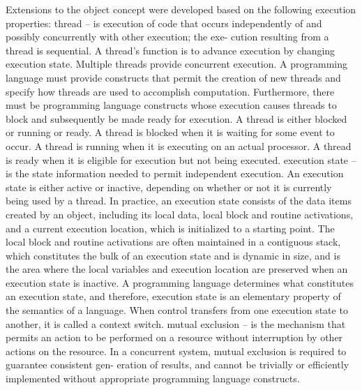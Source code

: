 Extensions to the object concept were developed based on the following execution
properties:
thread – is execution of code that occurs independently of and possibly
concurrently with other execution; the exe- cution resulting from a thread is
sequential. A thread’s function is to advance execution by changing execution
state. Multiple threads provide concurrent execution. A programming language
must provide constructs that permit the creation of new threads and specify how
threads are used to accomplish computation. Furthermore, there must be
programming language constructs whose execution causes threads to block and
subsequently be made ready for execution. A thread is either blocked or running
or ready. A thread is blocked when it is waiting for some event to occur. A
thread is running when it is executing on an actual processor. A thread is ready
when it is eligible for execution but not being executed.
execution state – is the state information needed to permit independent
execution. An execution state is either active or inactive, depending on whether
or not it is currently being used by a thread. In practice, an execution state
consists of the data items created by an object, including its local data, local
block and routine activations, and a current execution location, which is
initialized to a starting point. The local block and routine activations are
often maintained in a contiguous stack, which constitutes the bulk of an
execution state and is dynamic in size, and is the area where the local
variables and execution location are preserved when an execution state is
inactive. A programming language determines what constitutes an execution state,
and therefore, execution state is an elementary property of the semantics of a
language. When control transfers from one execution state to another, it is
called a context switch.
mutual exclusion – is the mechanism that permits an action to be performed on a
resource without interruption by other actions on the resource. In a concurrent
system, mutual exclusion is required to guarantee consistent gen- eration of
results, and cannot be trivially or efficiently implemented without appropriate
programming language constructs.

